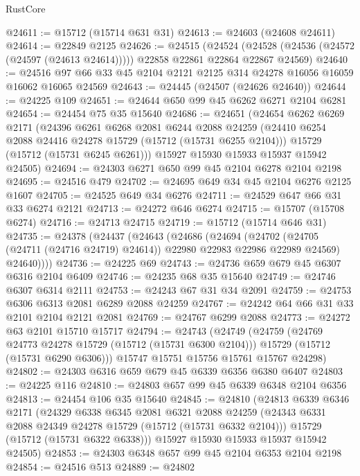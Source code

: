 \begin{lexlean}{RustCore}
\begin{coremodule}
@24611 := @15712 (@15714 @631 @31)
@24613 := @24603 (@24608 @24611)
@24614 := @22849 @2125
@24626 := @24515
    (@24524 (@24528 (@24536 (@24572 (@24597 (@24613 @24614))))) @22858 @22861 @22864 @22867 @24569)
@24640 := @24516 @97 @66 @33 @45 @2104 @2121 @2125 @314 @24278 @16056 @16059 @16062 @16065 @24569
@24643 := @24445 (@24507 (@24626 @24640))
@24644 := @24225 @109
@24651 := @24644 @650 @99 @45 @6262 @6271 @2104 @6281
@24654 := @24454 @75 @35 @15640
@24686 := @24651
    (@24654
      @6262
      @6269
      @2171
      (@24396
        @6261
        @6268
        @2081
        @6244
        @2088
        @24259
        (@24410 @6254 @2088 @24416 @24278 @15729 (@15712 (@15731 @6255 @2104)))
        @15729
        (@15712 (@15731 @6245 @6261)))
      @15927
      @15930
      @15933
      @15937
      @15942
      @24505)
@24694 := @24303 @6271 @650 @99 @45 @2104 @6278 @2104 @2198
@24695 := @24516 @479
@24702 := @24695 @649 @34 @45 @2104 @6276 @2125 @1607
@24705 := @24525 @649 @34 @6276
@24711 := @24529 @647 @66 @31 @33 @6274 @2121
@24713 := @24272 @646 @6274
@24715 := @15707 (@15708 @6274)
@24716 := @24713 @24715
@24719 := @15712 (@15714 @646 @31)
@24735 := @24378
    (@24437
      (@24643
        (@24686
          (@24694
            (@24702 (@24705 (@24711 (@24716 @24719) @24614)) @22980 @22983 @22986 @22989 @24569)
            @24640))))
@24736 := @24225 @69
@24743 := @24736 @659 @679 @45 @6307 @6316 @2104 @6409
@24746 := @24235 @68 @35 @15640
@24749 := @24746 @6307 @6314 @2111
@24753 := @24243 @67 @31 @34 @2091
@24759 := @24753 @6306 @6313 @2081 @6289 @2088 @24259
@24767 := @24242 @64 @66 @31 @33 @2101 @2104 @2121 @2081
@24769 := @24767 @6299 @2088
@24773 := @24272 @63 @2101 @15710 @15717
@24794 := @24743
    (@24749
      (@24759
        (@24769 @24773 @24278 @15729 (@15712 (@15731 @6300 @2104)))
        @15729
        (@15712 (@15731 @6290 @6306)))
      @15747
      @15751
      @15756
      @15761
      @15767
      @24298)
@24802 := @24303 @6316 @659 @679 @45 @6339 @6356 @6380 @6407
@24803 := @24225 @116
@24810 := @24803 @657 @99 @45 @6339 @6348 @2104 @6356
@24813 := @24454 @106 @35 @15640
@24845 := @24810
    (@24813
      @6339
      @6346
      @2171
      (@24329
        @6338
        @6345
        @2081
        @6321
        @2088
        @24259
        (@24343 @6331 @2088 @24349 @24278 @15729 (@15712 (@15731 @6332 @2104)))
        @15729
        (@15712 (@15731 @6322 @6338)))
      @15927
      @15930
      @15933
      @15937
      @15942
      @24505)
@24853 := @24303 @6348 @657 @99 @45 @2104 @6353 @2104 @2198
@24854 := @24516 @513
@24889 := @24802

\end{coremodule}
\end{lexlean}
